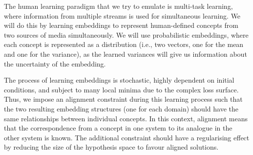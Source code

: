 The human learning paradigm that we try to emulate is multi-task learning, where information from multiple streams is used for simultaneous learning. We will do this by learning embeddings to represent human-defined concepts from two sources of media simultaneously. We will use probabilistic embeddings, where each concept is represented as a distribution (i.e., two vectors, one for the mean and one for the variance), as the learned variances will give us information about the uncertainty of the embedding. 

The process of learning embeddings is stochastic, highly dependent on initial conditions, and subject to many local minima due to the complex loss surface. Thus, we impose an alignment constraint during this learning process such that the two resulting embedding structures (one for each domain) should have the same relationships between individual concepts. In this context, alignment means that the correspondence from a concept in one system to its analogue in the other system is known. The additional constraint should have a regularising effect by reducing the size of the hypothesis space to favour aligned solutions. 




